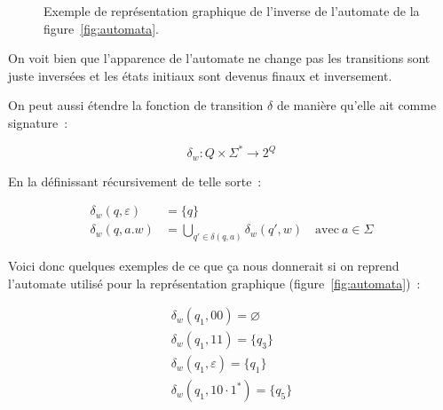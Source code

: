 \begin{figure}[H]
    \centering
    \captionsetup{type=figure,justification=centering}
    \caption{
        Exemple de représentation graphique de l'inverse de l'automate de la
        figure~\ref{fig:automata}.
    }\label{fig:automata_invserse}
\end{figure}

On voit bien que l'apparence de l'automate ne change pas les transitions sont
juste inversées et les états initiaux sont devenus finaux et inversement.

\vphantom{}

On peut aussi étendre la fonction de transition \(\delta\) de manière qu'elle
ait comme signature~:

\[
    \delta_w: Q \times \Sigma^* \to 2^Q
\]

En la définissant récursivement de telle sorte~:

\begin{align}
    \delta_w(q, \varepsilon) & = \{q\}                                                                         \\
    \delta_w(q, a.w)         & = \bigcup_{q' \in \delta(q, a)} \delta_w(q', w) \quad \text{avec}~ a \in \Sigma
\end{align}

\begin{example}
    Voici donc quelques exemples de ce que ça nous donnerait si on reprend
    l'automate utilisé pour la représentation graphique
    (figure~\ref{fig:automata})~:

    \begin{gather}
        \delta_w(q_1, 00) = \varnothing \\
        \delta_w(q_1, 11) = \{q_3\} \\
        \delta_w(q_1, \varepsilon) = \{q_1\} \\
        \delta_w(q_1, 10 \cdot 1^*) = \{q_5\}
    \end{gather}
\end{example}

